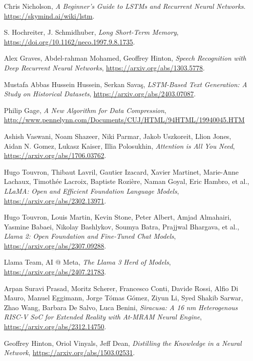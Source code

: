 \begin{thebibliography}{9}
	Chris Nicholson,
	\textit{A Beginner’s Guide to LSTMs and Recurrent Neural Networks}.
	\url{https://skymind.ai/wiki/lstm}.

	S. Hochreiter, J. Schmidhuber,
	\textit{Long Short-Term Memory},
	\url{https://doi.org/10.1162/neco.1997.9.8.1735}.

	Alex Graves, Abdel-rahman Mohamed, Geoffrey Hinton,
	\textit{Speech Recognition with Deep Recurrent Neural Networks},
	\url{https://arxiv.org/abs/1303.5778}.

	Mustafa Abbas Hussein Hussein, Serkan Savaş,
	\textit{LSTM-Based Text Generation: A Study on Historical Datasets},
	\url{https://arxiv.org/abs/2403.07087}.

	Philip Gage,
	\textit{A New Algorithm for Data Compression},
	\url{http://www.pennelynn.com/Documents/CUJ/HTML/94HTML/19940045.HTM}

	Ashish Vaswani, Noam Shazeer, Niki Parmar, Jakob Uszkoreit, Llion Jones, Aidan N. Gomez, Lukasz Kaiser, Illia Polosukhin,
	\textit{Attention is All You Need},
	\url{https://arxiv.org/abs/1706.03762}.

	Hugo Touvron, Thibaut Lavril, Gautier Izacard, Xavier Martinet, Marie-Anne Lachaux, Timothée Lacroix, Baptiste Rozière, Naman Goyal, Eric Hambro, et al.,
	\textit{LLaMA: Open and Efficient Foundation Language Models},
	\url{https://arxiv.org/abs/2302.13971}.

	Hugo Touvron, Louis Martin, Kevin Stone, Peter Albert, Amjad Almahairi, Yasmine Babaei, Nikolay Bashlykov, Soumya Batra, Prajjwal Bhargava, et al.,
	\textit{Llama 2: Open Foundation and Fine-Tuned Chat Models},
	\url{https://arxiv.org/abs/2307.09288}.

	Llama Team, AI @ Meta,
	\textit{The Llama 3 Herd of Models},
	\url{https://arxiv.org/abs/2407.21783}.

	Arpan Suravi Prasad, Moritz Scherer, Francesco Conti, Davide Rossi, Alfio Di Mauro, Manuel Eggimann, Jorge Tómas Gómez, Ziyun Li, Syed Shakib Sarwar, Zhao Wang, Barbara De Salvo, Luca Benini,
	\textit{Siracusa: A 16 nm Heterogenous RISC-V SoC for Extended Reality with At-MRAM Neural Engine},
	\url{https://arxiv.org/abs/2312.14750}.
	
	Geoffrey Hinton, Oriol Vinyals, Jeff Dean,
	\textit{Distilling the Knowledge in a Neural Network},
	\url{https://arxiv.org/abs/1503.02531}.
	

\end{thebibliography}
